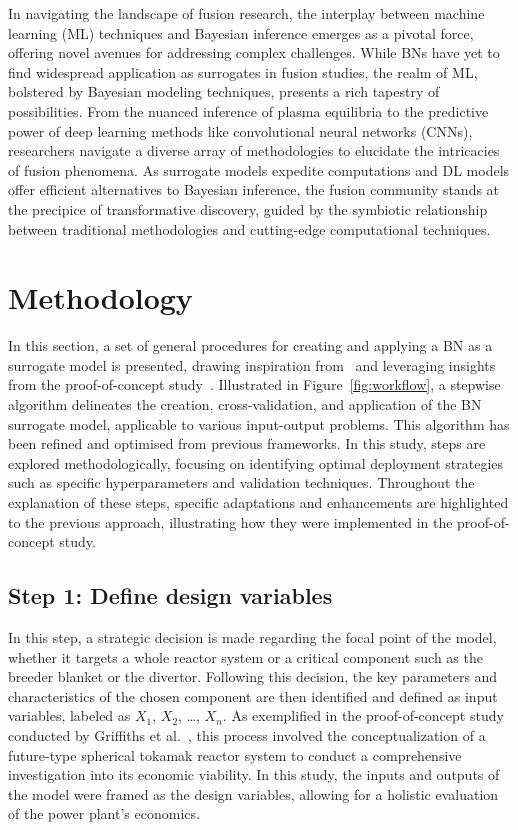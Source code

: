 \documentclass[journal]{IEEEtran}
\begin{document}
In navigating the landscape of fusion research, the interplay between machine learning (ML) techniques and Bayesian inference emerges as a pivotal force, offering novel avenues for addressing complex challenges. While BNs have yet to find widespread application as surrogates in fusion studies, the realm of ML, bolstered by Bayesian modeling techniques, presents a rich tapestry of possibilities. From the nuanced inference of plasma equilibria to the predictive power of deep learning methods like convolutional neural networks (CNNs), researchers navigate a diverse array of methodologies to elucidate the intricacies of fusion phenomena. As surrogate models expedite computations and DL models offer efficient alternatives to Bayesian inference, the fusion community stands at the precipice of transformative discovery, guided by the symbiotic relationship between traditional methodologies and cutting-edge computational techniques.

\section{Methodology}\label{sec:methodology}

In this section, a set of general procedures for creating and applying a BN as a surrogate model is presented, drawing inspiration from~\cite{Conti2019} and leveraging insights from the proof-of-concept study~\cite{Griffiths2024}. Illustrated in Figure~\ref{fig:workflow}, a stepwise algorithm delineates the creation, cross-validation, and application of the BN surrogate model, applicable to various input-output problems. This algorithm has been refined and optimised from previous frameworks. In this study, steps are explored methodologically, focusing on identifying optimal deployment strategies such as specific hyperparameters and validation techniques. Throughout the explanation of these steps, specific adaptations and enhancements are highlighted to the previous approach, illustrating how they were implemented in the proof-of-concept study.

\subsection{\textbf{Step 1}: Define design variables}\label{sec:design}

In this step, a strategic decision is made regarding the focal point of the model, whether it targets a whole reactor system or a critical component such as the breeder blanket or the divertor. Following this decision, the key parameters and characteristics of the chosen component are then identified and defined as input variables, labeled as $X_1$, $X_2$, \ldots, $X_n$. As exemplified in the proof-of-concept study conducted by Griffiths et al.~\cite{Griffiths2024}, this process involved the conceptualization of a future-type spherical tokamak reactor system to conduct a comprehensive investigation into its economic viability. In this study, the inputs and outputs of the model were framed as the design variables, allowing for a holistic evaluation of the power plant's economics.
\end{document}
